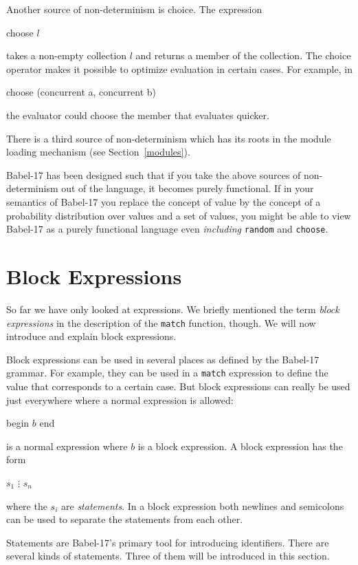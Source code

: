 \documentclass[11pt]{amsart}
\newcommand{\babelsrc}[1] {\lstinline!#1!}
\begin{document}
Another source of non-determinism is choice. The expression
\begin{babellisting}
choose $l$
\end{babellisting}
takes a non-empty collection $l$ and returns a member of the collection. The choice operator makes it possible to optimize evaluation in certain cases. For example, in 
\begin{babellisting}
choose (concurrent a, concurrent b)
\end{babellisting}
the evaluator could choose the member that evaluates quicker.

There is a third source of non-determinism which has its roots in the module loading mechanism (see Section~\ref{modules}). 

Babel-17 has been designed such that if you take the above sources of non-determinism out of the language, it becomes purely functional. If in your semantics of Babel-17 you replace the concept of value by the concept of a probability distribution over values and a set of values, you might be able to view Babel-17 as a purely functional language even \emph{including} \babelsrc{random} and \babelsrc{choose}.

\section{Block Expressions}
So far we have only looked at expressions. We briefly mentioned the term \emph{block expressions} in the description of the \babelsrc{match} function, though.  We will now introduce and explain block expressions.

Block expressions can be used in several places as defined by the Babel-17 grammar. For example, they can be used in a \babelsrc{match} expression to define the value that corresponds to a certain case. But block expressions can really be used just everywhere where a normal expression is allowed: 
\begin{babellisting}
begin
  $b$
end
\end{babellisting}
is a normal expression where $b$ is a block expression. A block expression has the form
\begin{babellisting}
$s_1$
$\vdots$
$s_n$
\end{babellisting}
where the $s_i$ are \emph{statements}. In a block expression both newlines and semicolons can be used to separate the statements from each other.

Statements are Babel-17's primary tool for introducing identifiers. There are several kinds of statements. Three of them will be introduced in this section.
\end{document}
